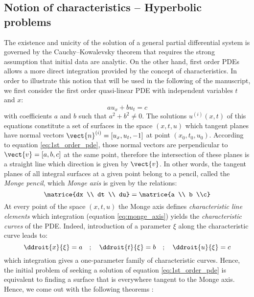 \subsection{Notion of characteristics -- Hyperbolic problems}
The existence and unicity of the solution of a general partial differential system is governed by the Cauchy--Kowalevsky theorem that requires the strong assumption that initial data are analytic. On the other hand, first order PDEs allows a more direct integration provided by the concept of characteristics. In order to illustrate this notion that will be used in the following of the manuscript, we first consider the first order quasi-linear PDE with independent variables $t$ and $x$:
\begin{equation}
  \label{eq:1st_order_pde}
   a u_x + b u_t  = c
\end{equation}
with coefficients $a$ and $b$ such that $a^2 + b^2 \neq 0$. The solutions $u^{(i)}(x,t)$ of this equations constitute a set of surfaces in the space $(x,t,u)$ which tangent planes have normal vectors $\vect{n}^{(i)}=[u_x,u_t,-1]$ at point $(x_0,t_0,u_0)$. According to equation \eqref{eq:1st_order_pde}, those normal vectors are perpendicular to $\vect{v}=[a,b,c]$ at the same point, therefore the intersection of these planes is a straight line which direction is given by $\vect{v}$. In other words, the tangent planes of all integral surfaces at a given point belong to a pencil, called the \textit{Monge pencil}, which \textit{Monge axis} is given by the relations:
\begin{equation}
  \label{eq:monge_axis}
  \matrice{dx \\ dt \\ du} = \matrice{a \\ b \\c}
\end{equation}
At every point of the space $(x,t,u)$ the Monge axis defines \textit{characteristic line elements} which integration (equation \eqref{eq:monge_axis}) yields the \textit{characteristic curves} of the PDE. Indeed, introduction of a parameter $\xi$ along the characteristic curve leads to:
\begin{equation}
  \label{eq:charac_curve}
  \ddroit{x}{\xi} = a \quad ; \quad \ddroit{t}{\xi} = b  \quad ; \quad \ddroit{u}{\xi} = c
\end{equation}
which integration gives a one-parameter family of characteristic curves. Hence, the initial problem of seeking a solution of equation \eqref{eq:1st_order_pde} is equivalent to finding a surface that is everywhere tangent to the Monge axis. Hence, we come out with the following theorems \cite[Chapter~2]{Courant}:
